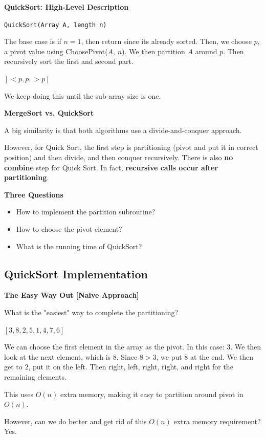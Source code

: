 \documentclass[11pt]{article}
\newcommand{\myeq}[1]{
    \vspace{11pt}
    \begin{center}
        ${#1}$
    \end{center}
    \vspace{11pt}
}
\newcommand{\boldsec}[1]{
    \vspace{11pt}
    \textbf{#1}
    \vspace{11pt}
}
\newcommand{\boldsecbottom}[1]{
    \textbf{#1}
    \vspace{11pt}
}
\begin{document}
\boldsec{QuickSort: High-Level Description}

\texttt{QuickSort(Array A, length n)}

The base case is if $n = 1$, then return since its already sorted. Then, we choose $p$, a pivot value using ChoosePivot($A$, $n$). We then partition $A$ around $p$. Then recursively sort the first and second part.

\myeq{[<p,p,>p]}

We keep doing this until the sub-array size is one.

\boldsecbottom{MergeSort vs. QuickSort}

A big similarity is that both algorithms use a divide-and-conquer approach.  

However, for Quick Sort, the first step is partitioning (pivot and put it in correct position) and then divide, and then conquer recursively. There is also \textbf{no} \textbf{combine} step for Quick Sort. In fact, \textbf{recursive calls occur after partitioning}.

\boldsec{Three Questions}
\begin{itemize}
    \item How to implement the partition subroutine?
    \item How to choose the pivot element?
    \item What is the running time of QuickSort?
\end{itemize}

\vspace{11pt}
\subsection{QuickSort Implementation}
\vspace{11pt}

\boldsecbottom{The Easy Way Out [Naive Approach]}

What is the "easiest" way to complete the partitioning?

\myeq{[3,8,2,5,1,4,7,6]}

We can choose the first element in the array as the pivot. In this case: 3. We then look at the next element, which is 8. Since $8 > 3$, we put 8 at the end. We then get to $2$, put it on the left. Then right, left, right, right, and right for the remaining elements.

This uses $O(n)$ extra memory, making it easy to partition around pivot in $O(n)$.

However, can we do better and get rid of this $O(n)$ extra memory requirement? Yes.
\end{document}
